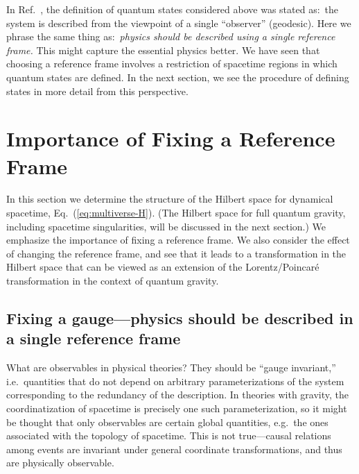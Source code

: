 \documentclass[12pt]{article}
\begin{document}
In Ref.~\cite{Nomura:2011dt}, the definition of quantum states considered 
above was stated as:\ the system is described from the viewpoint of 
a single ``observer'' (geodesic).  Here we phrase the same thing as:\ 
{\it physics should be described using a single reference frame.} 
This might capture the essential physics better.  We have seen that 
choosing a reference frame involves a restriction of spacetime regions 
in which quantum states are defined.  In the next section, we see the 
procedure of defining states in more detail from this perspective. 


\section{Importance of Fixing a Reference Frame}
\label{sec:Hilbert-frame}

In this section we determine the structure of the Hilbert space for 
dynamical spacetime, Eq.~(\ref{eq:multiverse-H}).  (The Hilbert space 
for full quantum gravity, including spacetime singularities, will be 
discussed in the next section.)  We emphasize the importance of fixing 
a reference frame.  We also consider the effect of changing the reference 
frame, and see that it leads to a transformation in the Hilbert space that 
can be viewed as an extension of the Lorentz/Poincar\'{e} transformation 
in the context of quantum gravity.


\subsection{Fixing a gauge---physics should be described in a single 
 reference frame}
\label{subsec:fix-gauge}

What are observables in physical theories?  They should be ``gauge 
invariant,'' i.e.\ quantities that do not depend on arbitrary 
parameterizations of the system corresponding to the redundancy of 
the description.  In theories with gravity, the coordinatization of 
spacetime is precisely one such parameterization, so it might be thought 
that only observables are certain global quantities, e.g.\ the ones 
associated with the topology of spacetime.  This is not true---causal 
relations among events are invariant under general coordinate 
transformations, and thus are physically observable.
\end{document}
